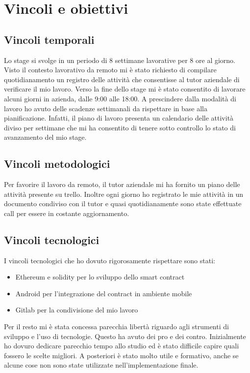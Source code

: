 \section{Vincoli e obiettivi}

\subsection{Vincoli temporali}
Lo stage si svolge in un periodo di 8 settimane lavorative per 8 ore al giorno. Visto il contesto lavorativo da remoto mi è stato richiesto di compilare quotidianamento un registro delle attività che consentisse al tutor aziendale di verificare il mio lavoro. Verso la fine dello stage mi è stato consentito di lavorare alcuni giorni in azienda, dalle 9:00 alle 18:00. A prescindere dalla modalità di lavoro ho avuto delle scadenze settimanali da rispettare in base alla pianificazione. 
Infatti, il piano di lavoro presenta un calendario delle attività diviso per settimane che mi ha consentito di tenere sotto controllo lo stato di avanzamento del mio stage.

\subsection{Vincoli metodologici}
Per favorire il lavoro da remoto, il tutor aziendale mi ha fornito un piano delle attività presente su trello. Inoltre ogni giorno ho registrato le mie attività in un documento condiviso con il tutor e quasi quotidianamente sono state effettuate call per essere in costante aggiornamento.


\subsection{Vincoli tecnologici}
I vincoli tecnologici che ho dovuto rigorosamente rispettare sono stati:
\begin{itemize}
	\item{Ethereum e solidity per lo sviluppo dello smart contract}
	\item{Android per l'integrazione del contract in ambiente mobile}
	\item{Gitlab per la condivisione del mio lavoro}
\end{itemize}
Per il resto mi è stata concessa parecchia libertà riguardo agli strumenti di sviluppo e l'uso di tecnologie. Questo ha avuto dei pro e dei contro. Inizialmente ho dovuro dedicare parecchio tempo allo studio ed è stato difficile capire quali fossero le scelte migliori. A posteriori è stato molto utile e formativo, anche se alcune cose non sono state utilizzate nell'implementazione finale.
